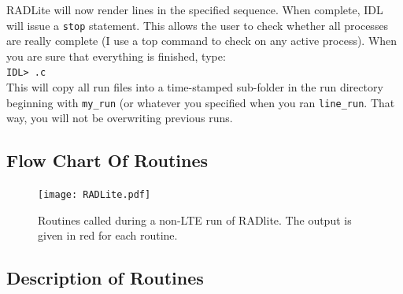 \documentclass[11pt]{article}
\begin{document}
\begin{itemize}
RADLite will now render lines in the specified sequence. When complete, IDL will issue a {\tt stop} statement. This allows the user to check
whether all processes are really complete (I use a top command to check on any active process). When you are sure that everything
is finished, type:\\
{\tt IDL> .c }\\

This will copy all run files into a time-stamped sub-folder in the run directory beginning with {\tt my\_run} (or whatever you specified when
you ran {\tt line\_run}. That way, you will not be overwriting previous runs. 

\end{itemize}

\subsection{Flow Chart Of Routines}

\begin{figure}
\centering
\texttt{[image: RADLite.pdf]}
\caption{Routines called during a non-LTE run of RADlite.  The output is given in red for each routine.}
\end{figure}

\subsection{Description of Routines}
\end{document}
